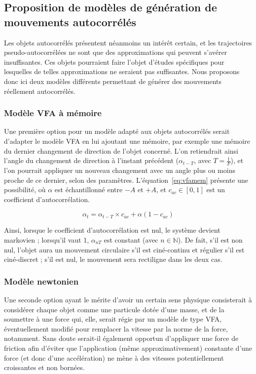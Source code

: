     \FloatBarrier \subsection{Proposition de modèles de génération de mouvements autocorrélés}
    Les objets autocorrélés présentent néanmoins un intérêt certain, et les trajectoires pseudo-autocorrélées ne sont que des approximations qui peuvent s'avérer insuffisantes. Ces objets pourraient faire l'objet d'études spécifiques pour lesquelles de telles approximations ne seraient pas suffisantes. Nous proposons donc ici deux modèles différents permettant de générer des mouvements réellement autocorrélés.
    
    \FloatBarrier \subsubsection{Modèle VFA à mémoire}
    Une première option pour un modèle adapté aux objets autocorrélés serait d'adapter le modèle VFA en lui ajoutant une mémoire, par exemple une mémoire du dernier changement de direction de l'objet concerné. L'on retiendrait ainsi l'angle du changement de direction à l'instant précédent ($\alpha_{t-T}$, avec $T = \frac{1}{F}$), et l'on pourrait appliquer un nouveau changement avec un angle plus ou moins proche de ce dernier, selon des paramètres. L'équation~\ref{eq:vfamem} présente une possibilité, où $\alpha$ est échantillonné entre $-A$ et $+A$, et $c_{ac} \in [0,1]$ est un coefficient d'autocorrélation.
    
    \begin{equation}
		\alpha_{t} = \alpha_{t-T} \times c_{ac} + \alpha (1 - c_{ac})
		\label{eq:vfamem}
    \end{equation}
    
	Ainsi, lorsque le coefficient d'autocorrélation est nul, le système devient markovien ; lorsqu'il vaut 1, $\alpha_{nT}$ est constant (avec $n \in \mathbb{N}$). De fait, s'il est non nul, l'objet aura un mouvement circulaire s'il est ciné-continu et régulier s'il est ciné-discret ; s'il est nul, le mouvement sera rectiligne dans les deux cas.
    
    \FloatBarrier \subsubsection{Modèle newtonien}
    Une seconde option ayant le mérite d'avoir un certain sens physique consisterait à considérer chaque objet comme une particule dotée d'une masse, et de la soumettre à une force qui, elle, serait régie par un modèle de type VFA, éventuellement modifié pour remplacer la vitesse par la norme de la force, notamment. Sans doute serait-il également opportun d'appliquer une force de friction afin d'éviter que l'application (même approximativement) constante d'une force (et donc d'une accélération\footnotemark{}) ne mène à des vitesses potentiellement croissantes et non bornées.
    
